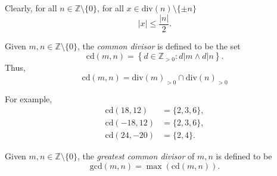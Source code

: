 Clearly, for all $n \in \mathbb Z \setminus \{0\}$, for all $x \in \mathrm{div}(n) \setminus \{\pm n\}$
$$
|x| \le \frac{|n|}{2}.
$$

\begin{definition}
	Given $m, n \in \mathbb Z \setminus \{0\}$, the \textit{common divisor} is defined to be the set
	$$
	\mathrm{cd}(m,n) = \left\{ d \in \mathbb Z_{> 0} : d|m \land d|n \right\}.
	$$
	Thus,
	$$
	\mathrm{cd}(m,n) = \mathrm{div}(m)_{> 0} \cap \mathrm{div}(n)_{>0}
	$$
\end{definition}


For example,
$$
\begin{aligned}
	\mathrm{cd}(18, 12) &= \{ 2, 3, 6 \}, \\
	\mathrm{cd}(-18, 12) &= \{ 2, 3, 6 \}, \\
	\mathrm{cd}(24, -20) &= \{ 2, 4 \}.
\end{aligned}
$$


\begin{definition}
	Given $m,n \in \mathbb Z \setminus \{0\}$, the \textit{greatest common divisor} of $m,n$ is defined to be
	$$
	\mathrm{gcd}(m,n) = \max(\mathrm{cd}(m,n)).
	$$
\end{definition}























%
